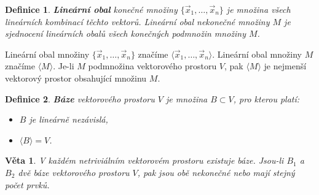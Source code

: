 \documentclass{article}
\newtheorem{df}{Definice}
\newtheorem{veta}{Věta}
\newcommand{\0}{\vec{0}}
\newcommand{\lo}[1]{\langle #1\rangle}
\newcommand{\xx}{\vec{x}}
\newcommand{\zz}{\vec{z}}
\begin{document}
\begin{df}
{\bf Lineární obal} konečné množiny $\{\xx_1,\ldots,\xx_n\}$ je množina všech lineárních kombinací těchto vektorů.
Lineární obal nekonečné množiny $M$ je sjednocení lineárních obalů všech konečných podmnožin množiny $M$.
\end{df}

Lineární obal množiny $\{\xx_1,\ldots,\xx_n\}$ značíme $\lo{\xx_1,\ldots,\xx_n}$.
Lineární obal množiny $M$ značíme $\lo{M}$.
% 
% 
% 
% 
Je-li $M$ podmnožina vektorového prostoru $V$, pak $\lo M$ je nej\-men\-ší vektorový prostor obsahující množinu $M$.


\begin{df}
{\bf Báze} vektorového prostoru $V$ je množina $B\subset V$, pro kterou platí:
\begin{itemize}
\item[(i)] $B$ je lineárně nezávislá,
\item[(ii)] $\lo B=V$.
\end{itemize}
\end{df}

\begin{veta}
V každém netriviálním vektorovém prostoru existuje báze.
Jsou-li $B_1$ a $B_2$ dvě báze vektorového prostoru $V$, pak jsou obě nekonečné nebo mají stejný počet prvků.
\end{veta}

\end{document}

